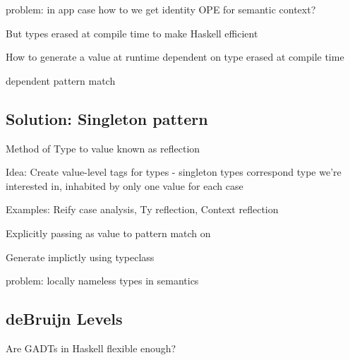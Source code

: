 \documentclass{article}
\begin{document}
problem: in app case how to we get identity OPE for semantic context?

But types erased at compile time to make Haskell efficient

How to generate a value at runtime dependent on type erased at compile time

dependent pattern match \cite{SingletonsGuide}

\subsection{Solution: Singleton pattern}

Method of Type to value known as reflection \cite{SingletonsGuide}

Idea: Create value-level tags for types - singleton types correspond type we're interested in, inhabited by only one value for each case

Examples: Reify case analysis, Ty reflection, Context reflection

Explicitly passing as value to pattern match on

Generate implictly using typeclass

problem: locally nameless types in semantics
\subsection{deBruijn Levels}
Are GADTs in Haskell flexible enough?

\cite{modalTypes}

\printbibliography
\end{document}
